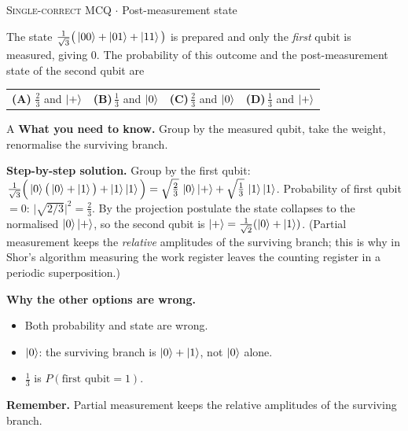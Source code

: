 \documentclass[11pt,a4paper]{article}
\newcommand{\optlabel}[1]{\textbf{(#1)}}
\newcommand{\correctlabel}[1]{\textcolor{okgreen}{\textbf{(#1)}\,\ding{51}}}
\newenvironment{qitem}[1]{\begin{list}{}{\setlength{\leftmargin}{3.3em}\setlength{\labelwidth}{3.1em}%
  \setlength{\labelsep}{0.2em}\setlength{\topsep}{3pt}\setlength{\parsep}{3pt}}\item[\textbf{Q.#1}\hfill]}{\end{list}}
\newcommand{\qsep}{\par\vspace{2pt}{\color{black!15}\hrule}\vspace{4pt}}
\newcommand{\qmeta}[2]{{\footnotesize\color{black!60}\textsc{#1} \;$\cdot$\; #2}\par}
\begin{document}
\begin{qitem}{29}
\qmeta{Single-correct MCQ}{Post-measurement state}
The state $\frac{1}{\sqrt3}\big(\ket{00} + \ket{01} + \ket{11}\big)$ is prepared and only the \emph{first} qubit is
measured, giving $0$. The probability of this outcome and the post-measurement state of the second qubit are
\par\smallskip\noindent\begin{tabularx}{\linewidth}{@{}*{4}{L}@{}}
\correctlabel{A}\,$\frac23$ and $\ket{+}$ & \optlabel{B}\,$\frac13$ and $\ket{0}$ & \optlabel{C}\,$\frac23$ and $\ket{0}$ & \optlabel{D}\,$\frac13$ and $\ket{+}$
\end{tabularx}
\end{qitem}
\begin{solbox}{A}
\textbf{\color{brand}What you need to know.} Group by the measured qubit, take the weight, renormalise the surviving branch.

\textbf{\color{brand}Step-by-step solution.} Group by the first qubit: $\frac{1}{\sqrt3}\Big(\ket0\big(\ket0 + \ket1\big) + \ket1\ket1\Big)
= \sqrt{\tfrac23}\,\ket0\ket{+} + \sqrt{\tfrac13}\,\ket1\ket1$.
Probability of first qubit $= 0$: $\big|\sqrt{2/3}\big|^2 = \frac23$. By the projection postulate the state collapses to the
normalised $\ket{0}\ket{+}$, so the second qubit is $\ket{+} = \frac{1}{\sqrt2}(\ket0 + \ket1)$.
(Partial measurement keeps the \emph{relative} amplitudes of the surviving branch; this is why in Shor's algorithm measuring
the work register leaves the counting register in a periodic superposition.)

\textbf{\color{brand}Why the other options are wrong.}
\begin{itemize}[leftmargin=2.4em, itemsep=1pt, topsep=2pt]
\item[\textbf{(B)}] Both probability and state are wrong.
\item[\textbf{(C)}] $\ket0$: the surviving branch is $\ket0 + \ket1$, not $\ket0$ alone.
\item[\textbf{(D)}] $\frac13$ is $P(\text{first qubit} = 1)$.
\end{itemize}
\textbf{\color{brand}Remember.} Partial measurement keeps the relative amplitudes of the surviving branch.
\end{solbox}
\qsep
\end{document}
